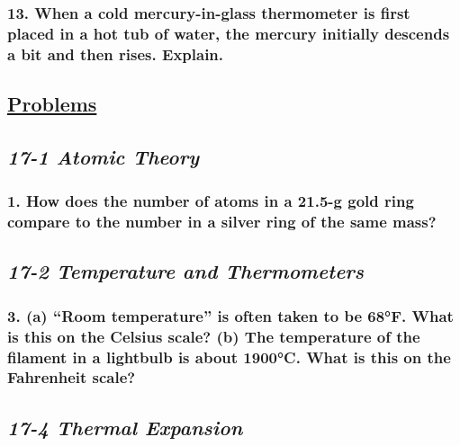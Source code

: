 \documentclass{article}
\begin{document}
\subsubsection*{
    13. When a cold mercury-in-glass thermometer is first placed in a hot
    tub of water, the mercury initially descends a bit and then rises. Explain.
}
\newpage
\begin{center}
    \section*{\textbf{\underline {Problems}}}
\end{center}
\begin{center}
    \subsection*{\textbf{\textit{17-1 Atomic Theory}}}
\end{center}
\subsubsection*{
    1. How does the number of atoms in a 21.5-g gold ring compare to
    the number in a silver ring of the same mass? 
}
\begin{center}
    \subsection*{\textbf{\textit{17-2 Temperature and Thermometers}}}
\end{center}
\subsubsection*{
    3. (a) “Room temperature” is often taken to be 68°F. What is this
    on the Celsius scale? (b) The temperature of the filament in a lightbulb
    is about 1900°C. What is this on the Fahrenheit scale?
}
\begin{center}
    \subsection*{\textbf{\textit{17-4 Thermal Expansion}}}
\end{center}
\end{document}
